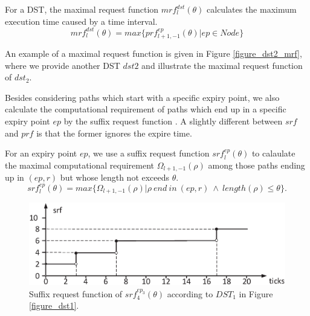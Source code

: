 \documentclass[sigconf]{acmart}
\begin{document}
\begin{definition}
For a DST, the maximal request function $mrf^{dst}_l(\theta)$ calculates the maximum execution time caused by a time interval.%
\begin{equation}
mrf^{dst}_l(\theta)=max\{prf^{ep}_{l+1,-1}(\theta)|ep\in Node\}
\end{equation}\label{equation_mrf}
\end{definition}

An example of a maximal request function is given in Figure \ref{figure_dst2_mrf}, where we provide another DST $dst2$ and illustrate the maximal request function of $dst_2$.

Besides considering paths which start with a specific expiry point, we also calculate the computational requirement of paths which end up in a specific expiry point $ep$ by the suffix request function \cite{DBLP:journals/rts/Stigge015a}. A slightly different between $srf$ and $prf$ is that the former ignores the expire time.%

\begin{definition}
For an expiry point $ep$, we use a suffix request function $srf^{ep}_{l}(\theta)$ to calaulate the maximal computational requirement $\Omega_{l+1,-1}(\rho)$ among those paths ending up in $(ep,r)$ but whose length not exceeds $\theta$.
\begin{equation}
srf^{ep}_l(\theta)=max\{\Omega_{l+1,-1}(\rho)|\rho\ end\ in\ (ep,r)\ \wedge\ length(\rho)\leq \theta\}.
\end{equation}\label{equation_srf}
\end{definition}
\begin{figure}[t]
  \centering
  \includegraphics[scale=0.31]{graphics/figure_srf.eps}
  \caption{Suffix request function of $srf^{ep_3}_{4}(\theta)$ according to $DST_1$ in Figure \ref{figure_dst1}.} 
  \label{figure_srf}
\end{figure}
\end{document}
